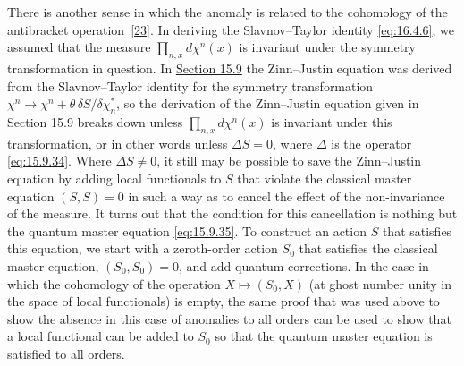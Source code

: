 There is another sense in which the anomaly is related to the cohomology
of the antibracket operation~\hyperref[ch22-ref-23]{[23]}. In deriving the
Slavnov--Taylor identity \eqref{eq:16.4.6}, we assumed that the measure
$\prod_{n,x}d\chi^n(x)$ is invariant under the symmetry transformation in
question. In \hyperref[sec:15.9]{Section 15.9} the Zinn--Justin equation was
derived from the Slavnov--Taylor identity for the symmetry transformation
$\chi^n\rightarrow\chi^n+\theta\,\delta S/\delta\chi_n^*$, so the
derivation of the Zinn--Justin equation given in Section 15.9 breaks down
unless $\prod_{n,x}d\chi^n(x)$ is invariant under this transformation, or
in other words unless $\Delta S=0$, where $\Delta$ is the operator
\eqref{eq:15.9.34}. Where $\Delta S\neq0$, it still may be possible to save
the Zinn--Justin equation by adding local functionals to $S$ that violate
the classical master equation $(S,S)=0$ in such a way as to cancel the
effect of the non-invariance of the measure. It turns out that the
condition for this cancellation is nothing but the quantum master equation
\eqref{eq:15.9.35}. To construct an action $S$ that satisfies this
equation, we start with a zeroth-order action $S_0$ that satisfies the
classical master equation, $(S_0,S_0)=0$, and add quantum corrections. In
the case in which the cohomology of the operation $X\mapsto(S_0,X)$ (at
ghost number unity in the space of local functionals) is empty, the same
proof that was used above to show the absence in this case of anomalies to
all orders can be used to show that a local functional can be added to
$S_0$ so that the quantum master equation is satisfied to all orders.
